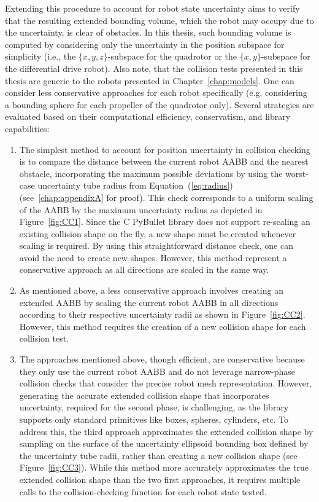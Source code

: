 Extending this procedure to account for robot state uncertainty aims to verify that the resulting extended bounding volume, which the robot may occupy due to the uncertainty, is clear of obstacles.
In this thesis, such bounding volume is computed by considering only the uncertainty in the position subspace for simplicity (i.e., the $\{x,y,z\}$-subspace for the quadrotor or the $\{x,y\}$-subspace for the differential drive robot).
Also note, that the collision tests presented in this thesis are generic to the robots presented in Chapter~\ref{chap:models}. 
One can consider less conservative approaches for each robot specifically (e.g. considering a bounding sphere for each propeller of the quadrotor only).
Several strategies are evaluated based on their computational efficiency, conservatism, and library capabilities:
\begin{enumerate}
    \item The simplest method to account for position uncertainty in collision checking is to compare the distance between the current robot AABB and the nearest obstacle, incorporating the maximum possible deviations by using the worst-case uncertainty tube radius from Equation~(\ref{eq:radius}) (see~\ref{chap:appendixA} for proof).
    This check corresponds to a uniform scaling of the AABB by the maximum uncertainty radius as depicted in Figure~\ref{fig:CC1}. 
    Since the C PyBullet library does not support re-scaling an existing collision shape on the fly, a new shape must be created whenever scaling is required. 
    By using this straightforward distance check, one can avoid the need to create new shapes.
    However, this method represent a conservative approach as all directions are scaled in the same way.
    \item As mentioned above, a less conservative approach involves creating an extended AABB by scaling the current robot AABB in all directions according to their respective uncertainty radii as shown in Figure~\ref{fig:CC2}. 
    However, this method requires the creation of a new collision shape for each collision test.
    \item The approaches mentioned above, though efficient, are conservative because they only use the current robot AABB and do not leverage narrow-phase collision checks that consider the precise robot mesh representation. 
    However, generating the accurate extended collision shape that incorporates uncertainty, required for the second phase, is challenging, as the library supports only standard primitives like boxes, spheres, cylinders, etc.
    To address this, the third approach approximates the extended collision shape by sampling on the surface of the uncertainty ellipsoid bounding box defined by the uncertainty tube radii, rather than creating a new collision shape (see Figure~\ref{fig:CC3}). 
    While this method more accurately approximates the true extended collision shape than the two first approaches, it requires multiple calls to the collision-checking function for each robot state tested.
\end{enumerate}

